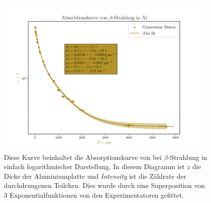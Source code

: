 \documentclass[12pt,english,ngerman]{scrartcl}
\begin{document}
\begin{figure}[H]
	\begin{center}
		\includegraphics[width=0.95\textwidth]{figures/absorption3er.pdf}
	\end{center}
	\caption[Absorptionskurve von  bei $\beta$-Strahlung (3er Superposition
		Experimentatoren)]{
		Diese Kurve beinhaltet die Absorptionskurve von  bei
		$\beta$-Strahlung in einfach logarithmischer Darstellung. In diesem Diagramm
		ist $z$ die Dicke der Aluminiumplatte und \emph{Intensity} ist die Zählrate der
		durchdrungenen Teilchen. Dies wurde durch eine Superposition von 3
		Exponentialfunktionen von den Experimentatoren gefittet.
	}\label{fig:3er_alu_abs}
\end{figure}
\end{document}
